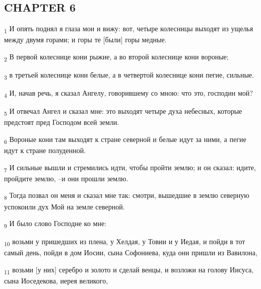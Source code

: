 \subsection{CHAPTER 6}
\begin{tcolorbox}
\textsubscript{1} И опять поднял я глаза мои и вижу: вот, четыре колесницы выходят из ущелья между двумя горами; и горы те [были] горы медные.
\end{tcolorbox}
\begin{tcolorbox}
\textsubscript{2} В первой колеснице кони рыжие, а во второй колеснице кони вороные;
\end{tcolorbox}
\begin{tcolorbox}
\textsubscript{3} в третьей колеснице кони белые, а в четвертой колеснице кони пегие, сильные.
\end{tcolorbox}
\begin{tcolorbox}
\textsubscript{4} И, начав речь, я сказал Ангелу, говорившему со мною: что это, господин мой?
\end{tcolorbox}
\begin{tcolorbox}
\textsubscript{5} И отвечал Ангел и сказал мне: это выходят четыре духа небесных, которые предстоят пред Господом всей земли.
\end{tcolorbox}
\begin{tcolorbox}
\textsubscript{6} Вороные кони там выходят к стране северной и белые идут за ними, а пегие идут к стране полуденной.
\end{tcolorbox}
\begin{tcolorbox}
\textsubscript{7} И сильные вышли и стремились идти, чтобы пройти землю; и он сказал: идите, пройдите землю, --и они прошли землю.
\end{tcolorbox}
\begin{tcolorbox}
\textsubscript{8} Тогда позвал он меня и сказал мне так: смотри, вышедшие в землю северную успокоили дух Мой на земле северной.
\end{tcolorbox}
\begin{tcolorbox}
\textsubscript{9} И было слово Господне ко мне:
\end{tcolorbox}
\begin{tcolorbox}
\textsubscript{10} возьми у пришедших из плена, у Хелдая, у Товии и у Иедая, и пойди в тот самый день, пойди в дом Иосии, сына Софониева, куда они пришли из Вавилона,
\end{tcolorbox}
\begin{tcolorbox}
\textsubscript{11} возьми [у них] серебро и золото и сделай венцы, и возложи на голову Иисуса, сына Иоседекова, иерея великого,
\end{tcolorbox}
